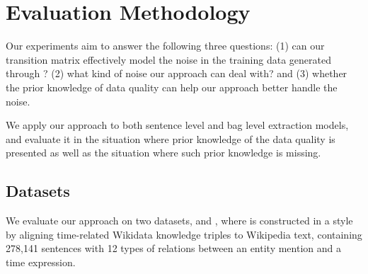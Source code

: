 \section{Evaluation Methodology}

Our experiments aim to answer the following three questions: (1) can our
transition matrix effectively model the noise in the training data generated
through \DS? (2) what kind of noise our approach can deal with? and (3)
whether the prior knowledge of data quality can help our approach better
handle the noise.

We apply our approach to both sentence level and bag level
extraction models, and evaluate it in the situation where prior knowledge of
the data quality is presented as well as the situation where such prior
knowledge is missing.


\subsection{Datasets}
We evaluate our approach on two datasets, \TimeRE and \EntityRE,  %
where \TimeRE is constructed
in a \DS style by aligning time-related Wikidata knowledge triples to
Wikipedia text, containing 278,141 sentences with 12
types of relations  between an entity mention and a time expression.

